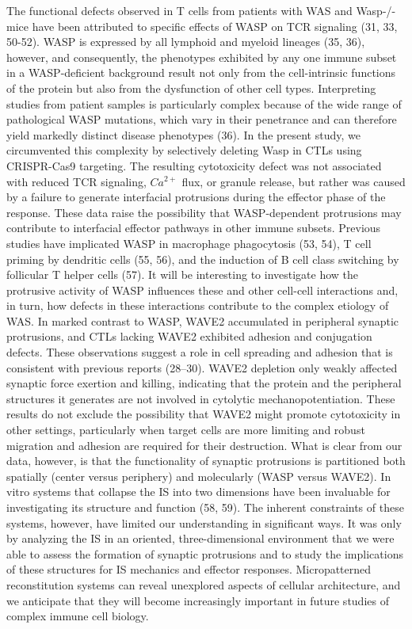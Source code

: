 The functional defects observed in T cells from patients with WAS and Wasp-/- mice have been attributed to specific effects of WASP on TCR signaling (31, 33, 50-52). WASP is expressed by all lymphoid and myeloid lineages (35, 36), however, and consequently, the phenotypes exhibited by any one immune subset in a WASP-deficient background result not only from the cell-intrinsic functions of the protein but also from the dysfunction of other cell types. Interpreting studies from patient samples is particularly complex because of the wide range of pathological WASP mutations, which vary in their penetrance and can therefore yield markedly distinct disease phenotypes (36). In the present study, we circumvented this complexity by selectively deleting Wasp in CTLs using CRISPR-Cas9 targeting. The resulting cytotoxicity defect was not associated with reduced TCR signaling, $Ca^{2+}$ flux, or granule release, but rather was caused by a failure to generate interfacial protrusions during the effector phase of the response. These data raise the possibility that WASP-dependent protrusions may contribute to interfacial effector pathways in other immune subsets. Previous studies have implicated WASP in macrophage phagocytosis (53, 54), T cell priming by dendritic cells (55, 56), and the induction of B cell class switching by follicular T helper cells (57). It will be interesting to investigate how the protrusive activity of WASP influences these and other cell-cell interactions and, in turn, how defects in these interactions contribute to the complex etiology of WAS. In marked contrast to WASP, WAVE2 accumulated in peripheral synaptic protrusions, and CTLs lacking WAVE2 exhibited adhesion and conjugation defects. These observations suggest a role in cell spreading and adhesion that is consistent with previous reports (28–30). WAVE2 depletion only weakly affected synaptic force exertion and killing, indicating that the protein and the peripheral structures it generates are not involved in cytolytic mechanopotentiation. These results do not exclude the possibility that WAVE2 might promote cytotoxicity in other settings, particularly when target cells are more limiting and robust migration and adhesion are required for their destruction. What is clear from our data, however, is that the functionality of synaptic protrusions is partitioned both spatially (center versus periphery) and molecularly (WASP versus WAVE2). In vitro systems that collapse the IS into two dimensions have been invaluable for investigating its structure and function (58, 59). The inherent constraints of these systems, however, have limited our understanding in significant ways. It was only by analyzing the IS in an oriented, three-dimensional environment that we were able to assess the formation of synaptic protrusions and to study the implications of these structures for IS mechanics and effector responses. Micropatterned reconstitution systems can reveal unexplored aspects of cellular architecture, and we anticipate that they will become increasingly important in future studies of complex immune cell biology.

